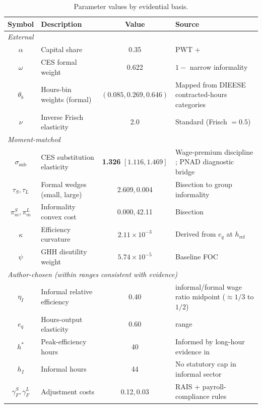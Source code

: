 \begin{table}[htbp]
\centering
\caption{Parameter values by evidential basis.}\label{tab:params}
\small
\begin{tabular}{@{}c p{3.1cm} c p{6.1cm}@{}}
\hline\hline
Symbol & Description & Value & Source \\
\hline
\multicolumn{4}{l}{\textit{External}} \\
\hline
$\alpha$     & Capital share                  & 0.35   & PWT + \citet{Gollin2002} \\
$\omega$     & CES formal weight              & 0.622  & $1-$ narrow informality \citep{PNAD2025} \\
$\theta_b$   & Hours-bin weights (formal)     & $(0.085, 0.269, 0.646)$ & Mapped from DIEESE contracted-hours categories \citep{DIEESE2024} \\
$\nu$        & Inverse Frisch elasticity       & 2.0    & Standard (Frisch $=0.5$) \\
\hline
\multicolumn{4}{l}{\textit{Moment-matched}} \\
\hline
$\sigma_{\text{sub}}$ & CES substitution elasticity & \textbf{1.326} $[1.116,1.469]$ & Wage-premium discipline \citep{MeghirNaritaRobin2015}; PNAD diagnostic bridge \citep{PNAD2025} \\
$\tau_S,\tau_L$       & Formal wedges (small, large) & 2.609,\,0.004 & Bisection to group informality \\
$\pi_m^S,\pi_m^L$     & Informality convex cost      & 0.000,\,42.11 & Bisection \\
$\kappa$               & Efficiency curvature         & $2.11\times 10^{-3}$ & Derived from $e_q$ at $h_{\text{ref}}$ \\
$\psi$                 & GHH disutility weight        & $5.74\times 10^{-5}$ & Baseline FOC \\
\hline
\multicolumn{4}{l}{\textit{Author-chosen (within ranges consistent with evidence)}} \\
\hline
$\eta_I$      & Informal relative efficiency   & 0.40   & \citet{LaPortaShleifer2014} informal/formal wage ratio midpoint ($\approx 1/3$ to $1/2$) \\
$e_q$          & Hours-output elasticity        & 0.60   & \citet{Pencavel2015} range \\
$h^*$          & Peak-efficiency hours          & 40     & Informed by long-hour evidence in \citet{Pencavel2015} \\
$h_I$          & Informal hours                 & 44     & No statutory cap in informal sector \\
$\gamma_F^S, \gamma_F^L$ & Adjustment costs        & 0.12,\,0.03 & RAIS + payroll-compliance rules \citep{RAIS2022,BrasilLei8212,ReceitaESocialRural2021} \\
\hline\hline
\end{tabular}
\end{table}

